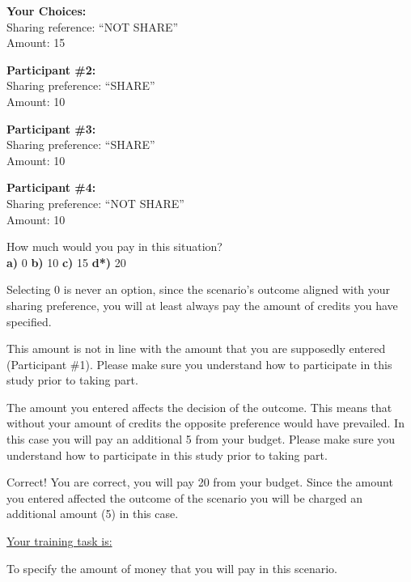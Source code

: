 \textbf{Your Choices:} \\
\indent \indent Sharing reference: 	``NOT SHARE'' \\
\indent \indent Amount:		15 

\textbf{Participant \#2:} \\ 
\indent \indent Sharing preference:	``SHARE'' \\
\indent \indent Amount: 		10

\textbf{Participant \#3:} \\
\indent \indent Sharing preference:	``SHARE'' \\
\indent \indent Amount: 		10

\textbf{Participant \#4:} \\
\indent \indent Sharing preference:	``NOT SHARE'' \\
\indent \indent Amount: 		10  

How much would you pay in this situation? \\
\indent \textbf{a)} 0 \indent \indent \textbf{b)} 10
\indent \indent \textbf{c)} 15
\indent \indent \textbf{d*)} 20

\clearpage
{} Selecting 0 is never an option, since the scenario's outcome aligned with your sharing preference, you will at least always pay the amount of credits you have specified.

 This amount is not in line with the amount that you are supposedly entered (Participant \#1). Please make sure you understand how to participate in this study prior to taking part.

 The amount you entered affects the decision of the outcome. This means that without your amount of credits the opposite preference would have prevailed. In this case you will pay an additional 5 from your budget. Please make sure you understand how to participate in this study prior to taking part.

 Correct! You are correct, you will pay 20 from your budget. Since the amount you entered affected the outcome of the scenario you will be charged an additional amount (5) in this case.





\underline{Your training task is:} 

To specify the amount of money that you will pay in this scenario. 


